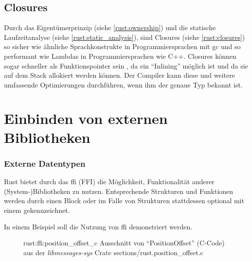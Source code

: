 \subsection{Closures}
\label{rust:zero_cost:closures}

Durch das Eigentümerprinzip (siehe \autoref{rust:ownership}) und die statische Laufzeitanalyse (siehe \autoref{rust:static_analysis}), sind Closures (siehe \autoref{rust:closures}) so sicher wie ähnliche Sprachkonstrukte in Programmiersprachen mit \gls{gc} und so performant wie Lambdas in Programmiersprachen wie C++.
Closures können sogar schneller als Funktionspointer sein \cite [310]{rust:orly_programming}, da ein \enquote{Inlining} möglich ist und da sie auf dem Stack allokiert werden können.
Der Compiler kann diese und weitere umfassende Optimierungen durchführen, wenn ihm der genaue Typ bekannt ist.



\section{Einbinden von externen Bibliotheken}

\subsubsection{Externe Datentypen}
\label{rust:ffi}
\label{rust:ffi:datatypes}

Rust bietet durch das \gls{ffi} (FFI) die Möglichkeit, Funktionalität anderer (System-)Bibliotheken zu nutzen.
Entsprechende Strukturen und Funktionen werden durch einen  Block
oder im Falle von Strukturen stattdessen optional mit einem \rustcinline{#[repr(C)]} gekennzeichnet.

In einem Beispiel soll die Nutzung von \gls{ffi} demonstriert werden.

\begin{figure}[H]
	\ccinclude
		{rust:ffi:position_offset_c}
		{Ausschnitt von \enquote{PositionOffset} (C-Code) aus der \textit{libmessages-sys} Crate}
		{sections/rust.position_offset.c}
	
\end{figure}

